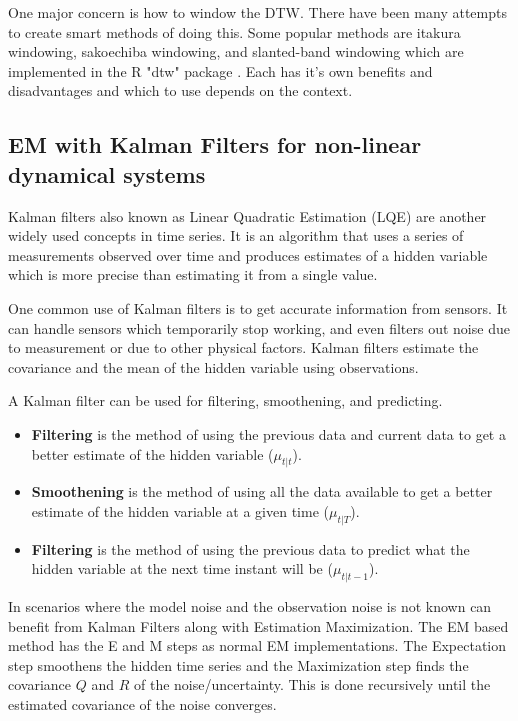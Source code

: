 \documentclass[hidelinks,BTech]{iitmdiss}
\begin{document}
One major concern is how to window the DTW. There have been many attempts to create smart methods of doing this. Some popular methods are itakura windowing, sakoechiba windowing, and slanted-band windowing which are implemented in the R "dtw" package \cite{RDTWPackage}. Each has it's own benefits and disadvantages and which to use depends on the context.

\subsection{EM with Kalman Filters for non-linear dynamical systems}

Kalman filters \cite{KalmanFilters} also known as Linear Quadratic Estimation (LQE) are another widely used concepts in time series. It is an algorithm that uses a series of measurements observed over time and produces estimates of a hidden variable which is more precise than estimating it from a single value.

One common use of Kalman filters is to get accurate information from sensors. It can handle sensors which temporarily stop working, and even filters out noise due to measurement or due to other physical factors. Kalman filters estimate the covariance and the mean of the hidden variable using observations.

A Kalman filter can be used for filtering, smoothening, and predicting.
\begin{itemize}
\item{{\bf Filtering} is the method of using the previous data and current data to get a better estimate of the hidden variable ($\mu_{t|t}$).}
\item{{\bf Smoothening} is the method of using all the data available to get a better estimate of the hidden variable at a given time ($\mu_{t|T}$).}
\item{{\bf Filtering} is the method of using the previous data to predict what the hidden variable at the next time instant will be ($\mu_{t|t-1}$).}
\end{itemize}

In scenarios where the model noise and the observation noise is not known can benefit from Kalman Filters along with Estimation Maximization. The EM based method has the E and M steps as normal EM implementations. The Expectation step smoothens the hidden time series and the Maximization step finds the covariance $Q$ and $R$ of the noise/uncertainty. This is done recursively until the estimated covariance of the noise converges.
\end{document}

